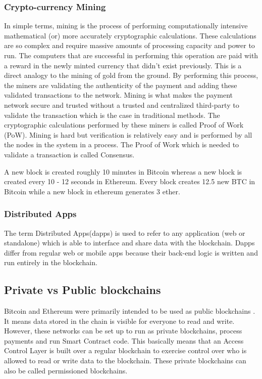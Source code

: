 \documentclass[11pt,openright]{report}
\begin{document}
\subsubsection{Crypto-currency Mining}\label{crypto-mining}
In simple terms, mining is the process of performing computationally intensive mathematical (or) more accurately cryptographic calculations. These calculations are so complex and require massive amounts of processing capacity and power to run. The computers that are successful in performing this operation are paid with a reward in the newly minted currency that didn't exist previously. This is a direct analogy to the mining of gold from the ground. By performing this process, the miners are validating the authenticity of the payment and adding these validated transactions to the network. Mining is what makes the payment network secure and trusted without a trusted and centralized third-party to validate the transaction which is the case in traditional methods. The cryptographic calculations performed by these miners is called Proof of Work (PoW). Mining is hard but verification is relatively easy and is performed by all the nodes in the system in a process. The Proof of Work which is needed to validate a transaction is called Consensus.

A new block is created roughly 10 minutes in Bitcoin whereas a new block is created every 10 - 12 seconds in Ethereum. Every block creates 12.5 new BTC in Bitcoin while a new block in ethereum generates 3 ether.

\subsubsection{Distributed Apps}
The term Distributed Apps(dapps) is used to refer to any application (web or standalone) which is able to interface and share data with the blockchain. 
Dapps differ from regular web or mobile apps because their back-end logic is written and run entirely in the blockchain.

\subsection{Private vs Public blockchains}
Bitcoin and Ethereum were primarily intended to be used as public blockchains \cite{privpubarticle}. It means data stored in the chain is visible for everyone to read and write. However, these networks can be set up to run as private blockchains, process payments and run Smart Contract code. This basically means that an Access Control Layer is built over a regular blockchain to exercise control over who is allowed to read or write data to the blockchain. These private blockchains can also be called permissioned blockchains.
\end{document}
